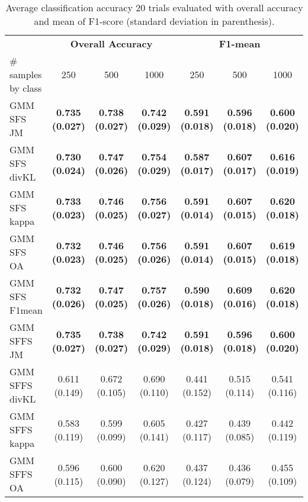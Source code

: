\documentclass[a4paper,10pt,DIV=16]{scrartcl}
\begin{document}
    \begin{table}[!t]
        \centering
        \caption{Average classification accuracy 20 trials evaluated with overall accuracy and mean of F1-score (standard deviation in parenthesis).\label{tab:aisa-otbsimu-othereval}}
        \begin{tabular}{lcccccc}\toprule
             & \multicolumn{3}{c}{\bfseries Overall Accuracy} & \multicolumn{3}{c}{\bfseries F1-mean} \\ \cmidrule{2-7}
            \# samples by class & 250 & 500 & 1000  & 250 & 500 & 1000 \\ \midrule

            GMM SFS JM &      {\bfseries 0.735 (0.027)} & {\bfseries 0.738 (0.027)} & {\bfseries 0.742 (0.029)} & {\bfseries 0.591 (0.018)} & {\bfseries 0.596 (0.018)} & {\bfseries 0.600 (0.020)} \\
            GMM SFS divKL &   {\bfseries 0.730 (0.024)} & {\bfseries 0.747 (0.026)} & {\bfseries 0.754 (0.029)} & {\bfseries 0.587 (0.017)} & {\bfseries 0.607 (0.017)} & {\bfseries 0.616 (0.019)} \\
            GMM SFS kappa &   {\bfseries 0.733 (0.023)} & {\bfseries 0.746 (0.025)} & {\bfseries 0.756 (0.027)} & {\bfseries 0.591 (0.014)} & {\bfseries 0.607 (0.015)} & {\bfseries 0.620 (0.018)} \\
            GMM SFS OA &      {\bfseries 0.732 (0.023)} & {\bfseries 0.746 (0.025)} & {\bfseries 0.756 (0.026)} & {\bfseries 0.591 (0.014)} & {\bfseries 0.607 (0.015)} & {\bfseries 0.619 (0.018)} \\
            GMM SFS F1mean &  {\bfseries 0.732 (0.026)} & {\bfseries 0.747 (0.025)} & {\bfseries 0.757 (0.026)} & {\bfseries 0.590 (0.018)} & {\bfseries 0.609 (0.016)} & {\bfseries 0.620 (0.018)} \\
            GMM SFFS JM &     {\bfseries 0.735 (0.027)} & {\bfseries 0.738 (0.027)} & {\bfseries 0.742 (0.029)} & {\bfseries 0.591 (0.018)} & {\bfseries 0.596 (0.018)} & {\bfseries 0.600 (0.020)} \\
            GMM SFFS divKL &  0.611 (0.149) & 0.672 (0.105) & 0.690 (0.110) & 0.441 (0.152) & 0.515 (0.114) & 0.541 (0.116) \\
            GMM SFFS kappa &  0.583 (0.119) & 0.599 (0.099) & 0.605 (0.141) & 0.427 (0.117) & 0.439 (0.085) & 0.442 (0.119) \\
            GMM SFFS OA &     0.596 (0.115) & 0.600 (0.090) & 0.620 (0.127) & 0.437 (0.124) & 0.436 (0.079) & 0.455 (0.109) \\

\end{tabular}
\end{table}
\end{document}
